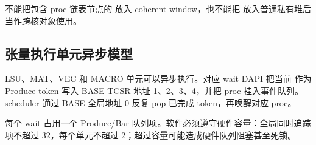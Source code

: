 \documentclass[../dayan_kernel_manual.tex]{subfiles}
\begin{document}
不能把包含 proc 链表节点的  放入 coherent window，也不能把
 放入普通私有堆后当作跨核对象使用。

\subsection{张量执行单元异步模型}

LSU、MAT、VEC 和 MACRO 单元可以异步执行。对应 wait DAPI 把当前  作为
Produce token 写入 BASE TCSR 地址 1、2、3、4，并把 proc 挂入事件队列。scheduler
通过 BASE 全局地址 0 反复 pop 已完成 token，再唤醒对应 proc。

每个 wait 占用一个 Produce/Bar 队列项。软件必须遵守硬件容量：全局同时追踪项不超过
32，每个单元不超过 2；超过容量可能造成硬件队列阻塞甚至死锁。
\end{document}
